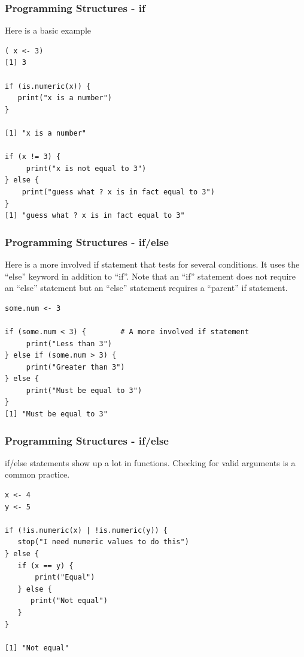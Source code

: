 \documentclass{beamer}
\begin{document}
%

\begin{frame}[fragile]
\frametitle{Programming Structures - if}
Here is a basic example
\small
\begin{verbatim}
( x <- 3)
[1] 3

if (is.numeric(x)) {
   print("x is a number")
} 

[1] "x is a number"

if (x != 3) {
     print("x is not equal to 3")
} else {
    print("guess what ? x is in fact equal to 3")
}
[1] "guess what ? x is in fact equal to 3"
\end{verbatim}
\end{frame}

%

\begin{frame}[fragile]
\frametitle{Programming Structures - if/else}
Here is a more involved if statement that tests for several conditions. It uses the ``else'' keyword in addition to ``if''. Note that an ``if'' statement does not require an ``else'' statement but an ``else'' statement requires a ``parent'' if statement.
\small
\begin{verbatim}
some.num <- 3               

if (some.num < 3) {        # A more involved if statement
     print("Less than 3")
} else if (some.num > 3) {
     print("Greater than 3")
} else {
     print("Must be equal to 3")
}
[1] "Must be equal to 3"
\end{verbatim}
\end{frame}

%

\begin{frame}[fragile]
\frametitle{Programming Structures - if/else}
if/else statements show up a lot in functions. Checking for valid arguments is a common practice.
\small
\begin{verbatim}
x <- 4 
y <- 5

if (!is.numeric(x) | !is.numeric(y)) {
   stop("I need numeric values to do this")
} else {
   if (x == y) {
       print("Equal")
   } else {
      print("Not equal")
   }
}

[1] "Not equal"
\end{verbatim}
\end{frame}


%
\end{document}
